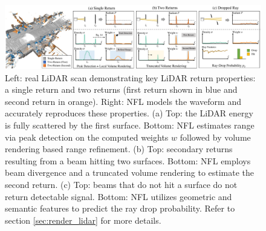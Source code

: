 \begin{figure}[t]
\centering
\includegraphics[width=1.0\columnwidth]{main/images/overview.pdf}
\caption{Left: real LiDAR scan demonstrating key LiDAR return properties: a \textcolor{mygray}{single return} and two returns (first return shown in \textcolor{myblue}{blue} and second return in \textcolor{myorange}{orange}). Right: NFL models the waveform and accurately reproduces these properties. (a) Top: the LiDAR energy is fully scattered by the first surface. Bottom: NFL estimates range via peak detection on the computed weights $w$ followed by volume rendering based range refinement. (b) Top: secondary returns resulting from a beam hitting two surfaces. Bottom: NFL employs beam divergence and a truncated volume rendering to estimate the second return. (c) Top: beams that do not hit a surface do not return detectable signal. Bottom: NFL utilizes geometric and semantic features to predict the ray drop probability. Refer to section \ref{sec:render_lidar} for more details. }
\label{fig:overview}
\end{figure}

